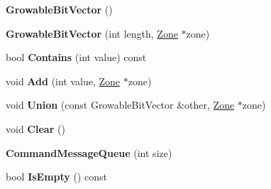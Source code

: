 \begin{DoxyCompactItemize}
\item 
\hypertarget{classv8_1_1internal_1_1_b_a_s_e___e_m_b_e_d_d_e_d_a21f6e6506780503ed723ff0941220478}{}{\bfseries Growable\+Bit\+Vector} ()\label{classv8_1_1internal_1_1_b_a_s_e___e_m_b_e_d_d_e_d_a21f6e6506780503ed723ff0941220478}

\item 
\hypertarget{classv8_1_1internal_1_1_b_a_s_e___e_m_b_e_d_d_e_d_aebb57d7125f51a9e736261fb71fcdda0}{}{\bfseries Growable\+Bit\+Vector} (int length, \hyperlink{classv8_1_1internal_1_1_zone}{Zone} $\ast$zone)\label{classv8_1_1internal_1_1_b_a_s_e___e_m_b_e_d_d_e_d_aebb57d7125f51a9e736261fb71fcdda0}

\item 
\hypertarget{classv8_1_1internal_1_1_b_a_s_e___e_m_b_e_d_d_e_d_a42a5eb418f1c37a97255e75d8f32c674}{}bool {\bfseries Contains} (int value) const \label{classv8_1_1internal_1_1_b_a_s_e___e_m_b_e_d_d_e_d_a42a5eb418f1c37a97255e75d8f32c674}

\item 
\hypertarget{classv8_1_1internal_1_1_b_a_s_e___e_m_b_e_d_d_e_d_af49704e7c28352d30460a37d105dc34f}{}void {\bfseries Add} (int value, \hyperlink{classv8_1_1internal_1_1_zone}{Zone} $\ast$zone)\label{classv8_1_1internal_1_1_b_a_s_e___e_m_b_e_d_d_e_d_af49704e7c28352d30460a37d105dc34f}

\item 
\hypertarget{classv8_1_1internal_1_1_b_a_s_e___e_m_b_e_d_d_e_d_a4c6ebe56c1557b14edddb16e4e1cae58}{}void {\bfseries Union} (const Growable\+Bit\+Vector \&other, \hyperlink{classv8_1_1internal_1_1_zone}{Zone} $\ast$zone)\label{classv8_1_1internal_1_1_b_a_s_e___e_m_b_e_d_d_e_d_a4c6ebe56c1557b14edddb16e4e1cae58}

\item 
\hypertarget{classv8_1_1internal_1_1_b_a_s_e___e_m_b_e_d_d_e_d_ac459434b795d52e3e98af829a58254ab}{}void {\bfseries Clear} ()\label{classv8_1_1internal_1_1_b_a_s_e___e_m_b_e_d_d_e_d_ac459434b795d52e3e98af829a58254ab}

\item 
\hypertarget{classv8_1_1internal_1_1_b_a_s_e___e_m_b_e_d_d_e_d_aedc6c9199a455d527bb5b16ab1ba916c}{}{\bfseries Command\+Message\+Queue} (int size)\label{classv8_1_1internal_1_1_b_a_s_e___e_m_b_e_d_d_e_d_aedc6c9199a455d527bb5b16ab1ba916c}

\item 
\hypertarget{classv8_1_1internal_1_1_b_a_s_e___e_m_b_e_d_d_e_d_a73fac08bafbeb8e39059e17d4e7db0b7}{}bool {\bfseries Is\+Empty} () const \label{classv8_1_1internal_1_1_b_a_s_e___e_m_b_e_d_d_e_d_a73fac08bafbeb8e39059e17d4e7db0b7}


\end{DoxyCompactItemize}
